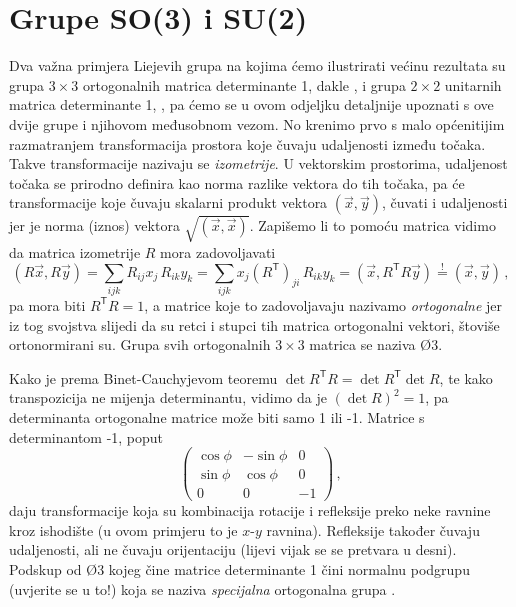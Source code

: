 \section{Grupe SO(3) i SU(2)}
\label{sec:so3su2}

Dva važna primjera Liejevih grupa na kojima  ćemo ilustrirati većinu rezultata
su grupa $3 \times 3$ ortogonalnih matrica determinante 1, dakle ,
i grupa $2 \times 2$ unitarnih matrica determinante 1, , pa ćemo
se u ovom odjeljku detaljnije upoznati s ove dvije grupe i njihovom
međusobnom vezom. No krenimo prvo
s malo općenitijim razmatranjem transformacija prostora koje
čuvaju udaljenosti između točaka.
Takve transformacije nazivaju se \emph{izometrije}. U vektorskim prostorima,
udaljenost točaka se prirodno definira kao norma razlike vektora do tih točaka,
pa će transformacije koje čuvaju skalarni produkt vektora $(\vec{x}, \vec{y})$,
čuvati i udaljenosti jer je norma (iznos) vektora $\sqrt{(\vec{x}, \vec{x})}$.
Zapišemo li to pomoću matrica vidimo da matrica izometrije $R$ mora zadovoljavati
\begin{equation}
    (R\vec{x}, R\vec{y}) = \sum_{ijk} R_{ij}x_{j} \, R_{ik} y_{k} = \sum_{ijk} x_{j} (R^\mathsf{T})_{ji}
    \, R_{ik} y_{k} = (\vec{x}, R^{\mathsf{T}} R \vec{y}) \stackrel{!}{=} (\vec{x}, \vec{y}) \,,
\end{equation}
pa mora biti $R^{\mathsf{T}} R = 1$, a matrice koje to zadovoljavaju
nazivamo \emph{ortogonalne} jer iz tog svojstva slijedi da su retci i stupci
tih matrica ortogonalni vektori, štoviše ortonormirani su. Grupa svih
ortogonalnih $3 \times 3$ matrica se naziva \O{3}.

Kako je prema Binet-Cauchyjevom teoremu $\det R^\mathsf{T} R = \det R^\mathsf{T} \det R$,
te kako transpozicija ne mijenja determinantu, vidimo da je $(\det R)^2 = 1$,
pa determinanta ortogonalne matrice može biti samo 1 ili -1. \label{pag:detO3}
Matrice s determinantom -1, poput 
\begin{equation}
\begin{pmatrix}
\cos\phi & -\sin\phi & 0 \\
\sin\phi & \cos\phi & 0 \\
0 & 0 & -1 \end{pmatrix} \,,
\end{equation}
daju transformacije koja su kombinacija rotacije i refleksije preko
neke ravnine kroz ishodište (u ovom primjeru to je $x$-$y$ ravnina).
Refleksije također čuvaju
udaljenosti, ali ne čuvaju orijentaciju (lijevi vijak se
se pretvara u desni). Podskup od \O{3} kojeg čine
matrice determinante 1 čini normalnu podgrupu (uvjerite se u to!)
koja se naziva \emph{specijalna} ortogonalna grupa .

